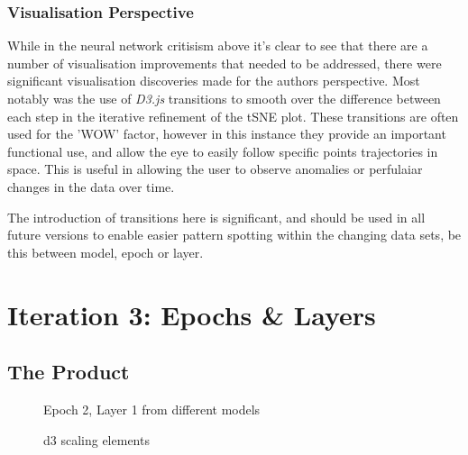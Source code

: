 \documentclass[a4paper,11pt,titlepage]{article}
\begin{document}
		\subsubsection{Visualisation Perspective}
		While in the neural network critisism above it's clear to see that there are a number of visualisation improvements that needed to be addressed, there were significant visualisation discoveries made for the authors perspective. Most notably was the use of \textit{D3.js} transitions to smooth over the difference between each step in the iterative refinement of the tSNE plot. These transitions are often used for the 'WOW' factor, however in this instance they provide an important functional use, and allow the eye to easily follow specific points trajectories in space. This is useful in allowing the user to observe anomalies or perfulaiar changes in the data over time.	
		\par 
		The introduction of transitions here is significant, and should be used in all future versions to enable easier pattern spotting within the changing data sets, be this between model, epoch or layer.
					
\section{Iteration 3: Epochs \& Layers}
	\subsection{The Product}	
	

	\begin{figure}[H]
    			\caption{Epoch 2, Layer 1 from different models}%
	\end{figure}	

	\begin{figure}[H]
    			\caption{d3 scaling elements}%
	\end{figure}	
\end{document}
